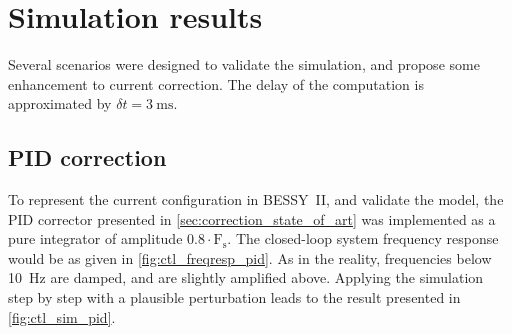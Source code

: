 \section{Simulation results}
Several scenarios were designed to validate the simulation, and propose some enhancement to current correction. The delay of the computation is approximated by $\delta t = \SI{3}{\milli\second}$.
 
\subsection{PID correction}
To represent the current configuration in BESSY~II, and validate the model, the PID corrector presented in \cref{sec:correction_state_of_art} was implemented as a pure integrator of amplitude $0.8\cdot \mathrm{F_s}$. The closed-loop system frequency response would be as given in \cref{fig:ctl_freqresp_pid}. As in the reality, frequencies below \SI{10}{\hertz} are damped, and are slightly amplified above. Applying the simulation step by step with a plausible perturbation leads to the result presented in \cref{fig:ctl_sim_pid}.

